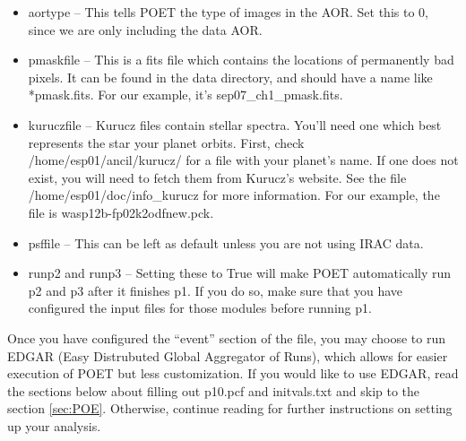 \documentclass[letterpaper,12pt]{article}
\begin{document}
\begin{itemize}
\item aortype -- This tells POET the type of images in the AOR. Set
  this to 0, since we are only including the data AOR.

\item pmaskfile -- This is a fits file which contains the locations of
  permanently bad pixels. It can be found in the data directory, and
  should have a name like *pmask.fits. For our example, it's
  sep07\_ch1\_pmask.fits.

\item kuruczfile -- Kurucz files contain stellar spectra. You'll need
  one which best represents the star your planet orbits. First, check
  /home/esp01/ancil/kurucz/ for a file with your planet's name. If one
  does not exist, you will need to fetch them from Kurucz's
  website. See the file /home/esp01/doc/info\_kurucz for more
  information. For our example, the file is wasp12b-fp02k2odfnew.pck.

\item psffile -- This can be left as default unless you are not using
  IRAC data.

\item runp2 and runp3 -- Setting these to True will make POET
  automatically run p2 and p3 after it finishes p1. If you do so, make
  sure that you have configured the input files for those modules
  before running p1.

\end{itemize}

Once you have configured the ``event'' section of the file, you may
choose to run EDGAR (Easy Distrubuted Global Aggregator of Runs),
which allows for easier execution of POET but less customization. If
you would like to use EDGAR, read the sections below about filling out
p10.pcf and initvals.txt and skip to the section
\ref{sec:POE}. Otherwise, continue reading for further instructions on
setting up your analysis.

\end{document}
